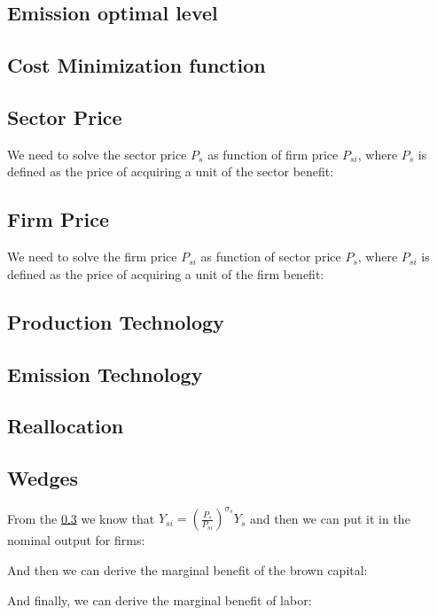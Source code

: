 \documentclass[12pt]{article} %
\begin{document}
\subsection{Emission optimal level} \label{Ap:emission optimal level}


\subsection{Cost Minimization function} \label{Ap:cost minimization function}


\subsection{Sector Price} \label{Ap:sector price}
 We need to solve the sector price $P_s$ as function of firm price $P_{si}$, where $P_s$ is defined as the price of acquiring a unit of the sector benefit:
    

\subsection{Firm Price} \label{Ap:firm_price}
We need to solve the firm price $P_{si}$ as function of sector price $P_s$, where $P_{si}$ is defined as the price of acquiring a unit of the firm benefit:
    

\subsection{Production Technology}
\label{Ap:Productiontechnology}

\subsection{Emission Technology}
\label{Ap:Emissiontechnology}



\subsection{Reallocation} \label{Ap:reallocation}




\subsection{Wedges} \label{Ap:wedges}
From the \ref{Ap:sector price} we know that $Y_{si} = (\frac{P_s}{ P_{si}})^{\sigma_s}{Y}_s $ and then we can put it in the nominal output for firms:

And then we can derive the marginal benefit of the brown capital:

And finally, we can derive the marginal benefit of labor:

\subsection*{}


\end{document}
